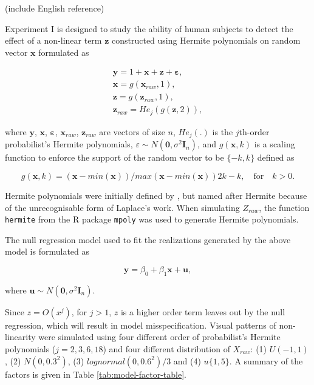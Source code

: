 \documentclass[]{interact}
\theoremstyle{plain}%
\theoremstyle{definition}
\theoremstyle{remark}
\begin{document}
(include English reference)

Experiment I is designed to study the ability of human subjects to
detect the effect of a non-linear term \(\boldsymbol{z}\) constructed
using Hermite polynomials on random vector \(\boldsymbol{x}\) formulated
as

\begin{align} \label{eq:nonlinearity-model}
\boldsymbol{y} = 1 + \boldsymbol{x} + \boldsymbol{z} + \boldsymbol{\varepsilon},\\
\boldsymbol{x} = g(\boldsymbol{x}_{raw}, 1), \\
\boldsymbol{z} = g(\boldsymbol{z}_{raw}, 1), \\
\boldsymbol{z}_{raw} = He_j(g(\boldsymbol{z}, 2)),
\end{align}

\noindent where \(\boldsymbol{y}\), \(\boldsymbol{x}\),
\(\boldsymbol{\varepsilon}\), \(\boldsymbol{x}_{raw}\),
\(\boldsymbol{z}_{raw}\) are vectors of size \(n\), \(He_{j}(.)\) is the
\(j\)th-order probabilist's Hermite polynomials,
\(\varepsilon \sim N(\boldsymbol{0}, \sigma^2\boldsymbol{I}_n)\), and
\(g(\boldsymbol{x}, k)\) is a scaling function to enforce the support of
the random vector to be \(\{-k, k\}\) defined as

\begin{equation} \label{eq:scaling-function}
g(\boldsymbol{x}, k) = (\boldsymbol{x} - min(\boldsymbol{x}))/max(\boldsymbol{x} - min(\boldsymbol{x}))2k - k, \quad \text{for} \quad k > 0. 
\end{equation}

Hermite polynomials were initially defined by \citet{de1820theorie}, but
named after Hermite \citep{hermite1864nouveau} because of the
unrecognisable form of Laplace's work. When simulating \(Z_{raw}\), the
function \texttt{hermite} from the R package \texttt{mpoly}
\citep{mpoly} was used to generate Hermite polynomials.

The null regression model used to fit the realizations generated by the
above model is formulated as

\begin{equation} \label{eq:null-model}
\boldsymbol{y} = \beta_0 + \beta_1 \boldsymbol{x} + \boldsymbol{u},
\end{equation}

\noindent where
\(\boldsymbol{u} \sim N(\boldsymbol{0}, \sigma^2\boldsymbol{I}_n)\).

Since \(z = O(x^j)\), for \(j > 1\), \(z\) is a higher order term leaves
out by the null regression, which will result in model misspecification.
Visual patterns of non-linearity were simulated using four different
order of probabilist's Hermite polynomials (\(j = 2, 3, 6, 18\)) and
four different distribution of \(X_{raw}\): (1) \(U(-1, 1)\), (2)
\(N(0, 0.3^2)\), (3) \(lognormal(0, 0.6^2)/3\) and (4) \(u\{1, 5\}\). A
summary of the factors is given in Table \ref{tab:model-factor-table}.
\end{document}
